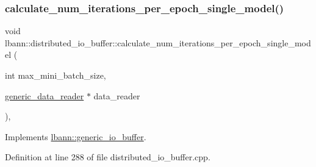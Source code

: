 \mbox{\label{classlbann_1_1distributed__io__buffer_a2a611c36620155646e46e065e040541f}} 
\subsubsection{\texorpdfstring{calculate\+\_\+num\+\_\+iterations\+\_\+per\+\_\+epoch\+\_\+single\+\_\+model()}{calculate\_num\_iterations\_per\_epoch\_single\_model()}}
{\footnotesize\ttfamily void lbann\+::distributed\+\_\+io\+\_\+buffer\+::calculate\+\_\+num\+\_\+iterations\+\_\+per\+\_\+epoch\+\_\+single\+\_\+model (\begin{DoxyParamCaption}\item[{int}]{max\+\_\+mini\+\_\+batch\+\_\+size,  }\item[{\hyperlink{classlbann_1_1generic__data__reader}{generic\+\_\+data\+\_\+reader} $\ast$}]{data\+\_\+reader }\end{DoxyParamCaption})\hspace{0.3cm}{\ttfamily [override]}, {\ttfamily [virtual]}}



Implements \hyperlink{classlbann_1_1generic__io__buffer_a4c71135fada7f0da0b315d538d327e59}{lbann\+::generic\+\_\+io\+\_\+buffer}.



Definition at line 288 of file distributed\+\_\+io\+\_\+buffer.\+cpp.


